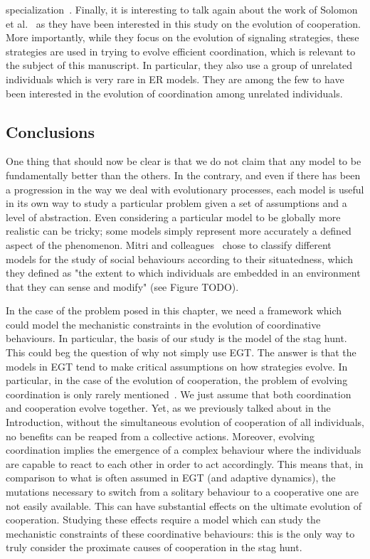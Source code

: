 specialization~\parencite{Duarte2011}. Finally, it is interesting to talk again about the work of Solomon et al.~\parencite{Solomon2012} as they have been interested in this study on the evolution of cooperation. More importantly, while they focus on the evolution of signaling strategies, these strategies are used in trying to evolve efficient coordination, which is relevant to the subject of this manuscript. In particular, they also use a group of unrelated individuals which is very rare in ER models. They are among the few to have been interested in the evolution of coordination among unrelated individuals. 


  \subsection{Conclusions}

    One thing that should now be clear is that we do not claim that any model to be fundamentally better than the others. In the contrary, and even if there has been a progression in the way we deal with evolutionary processes, each model is useful in its own way to study a particular problem given a set of assumptions and a level of abstraction. Even considering a particular model to be globally more realistic can be tricky; some models simply represent more accurately a defined aspect of the phenomenon. Mitri and colleagues~\parencite{Mitri2012} chose to classify different models for the study of social behaviours according to their situatedness, which they defined as "the extent to which individuals are embedded in an environment that they can sense and modify" (see Figure TODO).

    In the case of the problem posed in this chapter, we need a framework which could model the mechanistic constraints in the evolution of coordinative behaviours. In particular, the basis of our study is the model of the stag hunt. This could beg the question of why not simply use EGT. The answer is that the models in EGT tend to make critical assumptions on how strategies evolve. In particular, in the case of the evolution of cooperation, the problem of evolving coordination is only rarely mentioned~\parencite{Forber2015}. We just assume that both coordination and cooperation evolve together. Yet, as we previously talked about in the Introduction, without the simultaneous evolution of cooperation of all individuals, no benefits can be reaped from a collective actions. Moreover, evolving coordination implies the emergence of a complex behaviour where the individuals are capable to react to each other in order to act accordingly. This means that, in comparison to what is often assumed in EGT (and adaptive dynamics), the mutations necessary to switch from a solitary behaviour to a cooperative one are not easily available. This can have substantial effects on the ultimate evolution of cooperation. Studying these effects require a model which can study the mechanistic constraints of these coordinative behaviours: this is the only way to truly consider the proximate causes of cooperation in the stag hunt.

